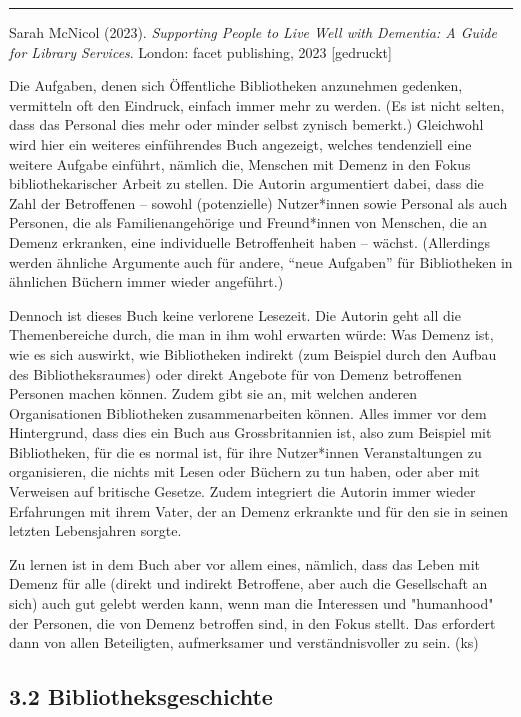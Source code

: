 \documentclass[a4paper,
fontsize=11pt,
oneside,
numbers=noperiodatend,
parskip=half-,
bibliography=totoc,
final
]{scrartcl}
\begin{document}
\begin{center}\rule{0.5\linewidth}{0.5pt}\end{center}

Sarah McNicol (2023). \emph{Supporting People to Live Well with
Dementia: A Guide for Library Services}. London: facet publishing, 2023
{[}gedruckt{]}

Die Aufgaben, denen sich Öffentliche Bibliotheken anzunehmen gedenken,
vermitteln oft den Eindruck, einfach immer mehr zu werden. (Es ist nicht
selten, dass das Personal dies mehr oder minder selbst zynisch bemerkt.)
Gleichwohl wird hier ein weiteres einführendes Buch angezeigt, welches
tendenziell eine weitere Aufgabe einführt, nämlich die, Menschen mit
Demenz in den Fokus bibliothekarischer Arbeit zu stellen. Die Autorin
argumentiert dabei, dass die Zahl der Betroffenen -- sowohl
(potenzielle) Nutzer*innen sowie Personal als auch Personen, die als
Familienangehörige und Freund*innen von Menschen, die an Demenz
erkranken, eine individuelle Betroffenheit haben -- wächst. (Allerdings
werden ähnliche Argumente auch für andere, \enquote{neue Aufgaben} für
Bibliotheken in ähnlichen Büchern immer wieder angeführt.)

Dennoch ist dieses Buch keine verlorene Lesezeit. Die Autorin geht all
die Themenbereiche durch, die man in ihm wohl erwarten würde: Was Demenz
ist, wie es sich auswirkt, wie Bibliotheken indirekt (zum Beispiel durch
den Aufbau des Bibliotheksraumes) oder direkt Angebote für von Demenz
betroffenen Personen machen können. Zudem gibt sie an, mit welchen
anderen Organisationen Bibliotheken zusammenarbeiten können. Alles immer
vor dem Hintergrund, dass dies ein Buch aus Grossbritannien ist, also
zum Beispiel mit Bibliotheken, für die es normal ist, für ihre
Nutzer*innen Veranstaltungen zu organisieren, die nichts mit Lesen oder
Büchern zu tun haben, oder aber mit Verweisen auf britische Gesetze.
Zudem integriert die Autorin immer wieder Erfahrungen mit ihrem Vater,
der an Demenz erkrankte und für den sie in seinen letzten Lebensjahren
sorgte.

Zu lernen ist in dem Buch aber vor allem eines, nämlich, dass das Leben
mit Demenz für alle (direkt und indirekt Betroffene, aber auch die
Gesellschaft an sich) auch gut gelebt werden kann, wenn man die
Interessen und "humanhood" der Personen, die von Demenz betroffen sind,
in den Fokus stellt. Das erfordert dann von allen Beteiligten,
aufmerksamer und verständnisvoller zu sein. (ks)

\hypertarget{bibliotheksgeschichte}{%
\subsection{3.2 Bibliotheksgeschichte}\label{bibliotheksgeschichte}}
\end{document}
